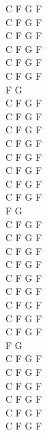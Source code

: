 \begin{chord}
C F G F\\
C F G F\\
C F G F\\
C F G F\\

C F G F\\
C F G F\\
F G\\
C F G F\\
C F G F\\

C F G F\\
C F G F\\
C F G F\\
C F G F\\

C F G F\\
C F G F\\
F G\\
C F G F\\
C F G F\\

C F G F\\
C F G F\\
C F G F\\
C F G F\\

C F G F\\

C F G F\\
C F G F\\
F G\\
C F G F\\
C F G F\\

C F G F\\
C F G F\\
C F G F\\
C F G F\\
\end{chord}
